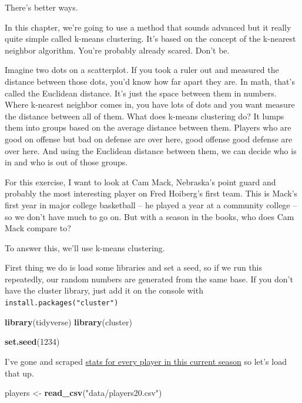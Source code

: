 \documentclass[
]{book}
\newenvironment{Shaded}{\begin{snugshade}}{\end{snugshade}}
\newcommand{\DecValTok}[1]{\textcolor[rgb]{0.00,0.00,0.81}{#1}}
\newcommand{\KeywordTok}[1]{\textcolor[rgb]{0.13,0.29,0.53}{\textbf{#1}}}
\newcommand{\NormalTok}[1]{#1}
\newcommand{\StringTok}[1]{\textcolor[rgb]{0.31,0.60,0.02}{#1}}
\begin{document}
There's better ways.

In this chapter, we're going to use a method that sounds advanced but it really quite simple called k-means clustering. It's based on the concept of the k-nearest neighbor algorithm. You're probably already scared. Don't be.

Imagine two dots on a scatterplot. If you took a ruler out and measured the distance between those dots, you'd know how far apart they are. In math, that's called the Euclidean distance. It's just the space between them in numbers. Where k-nearest neighbor comes in, you have lots of dots and you want measure the distance between all of them. What does k-means clustering do? It lumps them into groups based on the average distance between them. Players who are good on offense but bad on defense are over here, good offense good defense are over here. And using the Euclidean distance between them, we can decide who is in and who is out of those groups.

For this exercise, I want to look at Cam Mack, Nebraska's point guard and probably the most interesting player on Fred Hoiberg's first team. This is Mack's first year in major college basketball -- he played a year at a community college -- so we don't have much to go on. But with a season in the books, who does Cam Mack compare to?

To answer this, we'll use k-means clustering.

First thing we do is load some libraries and set a seed, so if we run this repeatedly, our random numbers are generated from the same base. If you don't have the cluster library, just add it on the console with \texttt{install.packages("cluster")}

\begin{Shaded}
\begin{Highlighting}[]
\KeywordTok{library}\NormalTok{(tidyverse)}
\KeywordTok{library}\NormalTok{(cluster)}

\KeywordTok{set.seed}\NormalTok{(}\DecValTok{1234}\NormalTok{)}
\end{Highlighting}
\end{Shaded}

I've gone and scraped \href{https://unl.box.com/s/0g56ve61y6hakyxzr1u4t534721bqvg8}{stats for every player in this current season} so let's load that up.

\begin{Shaded}
\begin{Highlighting}[]
\NormalTok{players <-}\StringTok{ }\KeywordTok{read_csv}\NormalTok{(}\StringTok{"data/players20.csv"}\NormalTok{)}
\end{Highlighting}
\end{Shaded}
\end{document}
